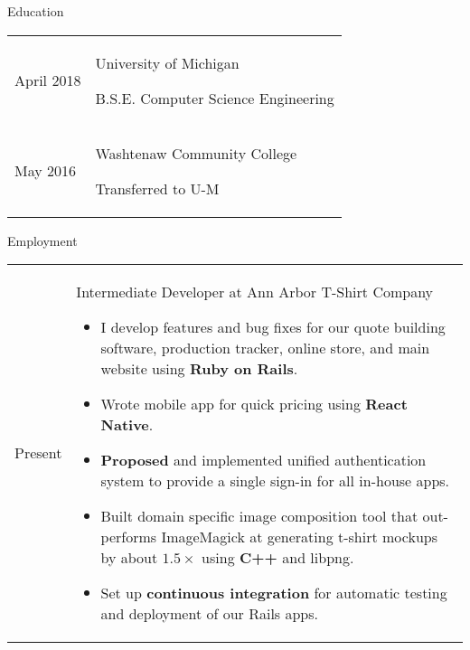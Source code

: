 \documentclass[12pt]{article}
\renewcommand{\section}[1]{{\Huge{#1}}\vspace{2 mm}}
\newenvironment{timeline}
        {\begin{tabular}{p{21 mm}|p{150 mm}}}
        {\end{tabular}}
\newenvironment{timelinetitle}
        {\vspace{-2 mm}\begin{large}}
        {\end{large}\vspace{-1.5 mm}}
\newcommand{\timespan}[2]{{#2}\newline{#1}}
\begin{document}
\section{Education}
\hline

\begin{timeline}
\timespan{Sept. 2016}{April 2018}
&
\begin{timelinetitle}
    University of Michigan
\end{timelinetitle}
\hspace{16mm}
B.S.E. Computer Science Engineering
\vspace{3 mm}

\\

\timespan{Sept. 2012}{May 2016}
&
\begin{timelinetitle}
    Washtenaw Community College
\end{timelinetitle}
\hspace{29mm}
Transferred to U-M

\end{timeline}

\vspace{3.0 mm}
\section{Employment}
\hline

\begin{timeline}
\timespan{Feb. 2014}{Present}
&
\begin{timelinetitle}
    Intermediate Developer at Ann Arbor T-Shirt Company
\end{timelinetitle}
\begin{itemize}
  \item I develop features and bug fixes for our quote building software,
        production tracker, online store, and main website using \textbf{Ruby on Rails}.

  \item Wrote mobile app for quick pricing using \textbf{React Native}.

  \item \textbf{Proposed} and implemented unified authentication system to provide a single
        sign-in for all in-house apps.

  \item Built domain specific image composition tool that out-performs ImageMagick
        at generating t-shirt mockups by about $1.5\times$ using \textbf{C++} and libpng.

  \item Set up \textbf{continuous integration} for automatic testing and deployment of
        our Rails apps.
\end{itemize}

\end{timeline}
\end{document}
